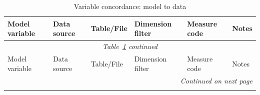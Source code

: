 \documentclass[11pt,a4paper]{article}
\begin{document}
\begin{landscape}
\begin{longtable}{@{}p{2.5cm}p{3cm}p{2cm}p{2.5cm}p{3cm}p{3cm}@{}}
\caption{Variable concordance: model to data}\label{tab:concordance_table}\\
\toprule
Model variable & Data source & Table/File & Dimension filter & Measure code & Notes \\
\midrule
\endfirsthead
\multicolumn{6}{c}{\textit{Table~\ref{tab:concordance_table} continued}}\\
\toprule
Model variable & Data source & Table/File & Dimension filter & Measure code & Notes \\
\midrule
\endhead
\midrule
\multicolumn{6}{r}{\textit{Continued on next page}}\\
\endfoot
\bottomrule
\endlastfoot


\end{longtable}
\end{landscape}
\end{document}

